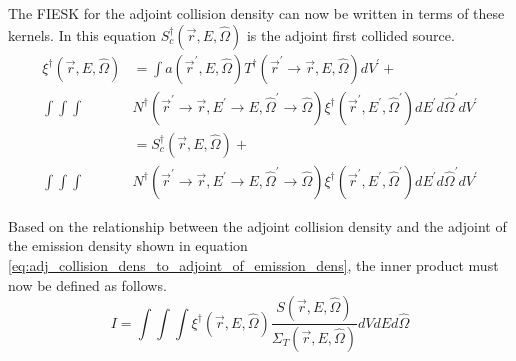 The FIESK for the adjoint collision density can now be written in terms of 
these kernels. In this equation $S_c^{\dagger}(\vec{r},E,\hat{\Omega})$ is the
adjoint first collided source.
\begin{align}
  \xi^{\dagger}(\vec{r},E,\hat{\Omega}) & = \int a(\vec{r}^{'},E,\hat{\Omega}) 
  T^{\dagger}(\vec{r}^{'} \to \vec{r},E,\hat{\Omega}) dV^{'} + \nonumber \\
  \int\int\int &
  N^{\dagger}(\vec{r}^{'} \to \vec{r},E^{'} \to E,\hat{\Omega}^{'} \to \hat{\Omega})
  \xi^{\dagger}(\vec{r}^{'},E^{'},\hat{\Omega}^{'}) dE^{'}d\hat{\Omega}^{'}dV^{'}
  \nonumber \\
  & = S_c^{\dagger}(\vec{r},E,\hat{\Omega}) + \nonumber \\
  \int\int\int &
  N^{\dagger}(\vec{r}^{'} \to \vec{r},E^{'} \to E,\hat{\Omega}^{'} \to \hat{\Omega})
      \xi^{\dagger}(\vec{r}^{'},E^{'},\hat{\Omega}^{'}) dE^{'}d\hat{\Omega}^{'}dV^{'}
  \nonumber
\end{align}

Based on the relationship between the adjoint collision density and the adjoint
of the emission density shown in equation 
\ref{eq:adj_collision_dens_to_adjoint_of_emission_dens}, the inner product must
now be defined as follows.
\begin{equation}
  I = \int\int\int \xi^{\dagger}(\vec{r},E,\hat{\Omega})
  \frac{S(\vec{r},E,\hat{\Omega})}{\Sigma_T(\vec{r},E,\hat{\Omega})}
  dV dE d\hat{\Omega}
\end{equation}
 
